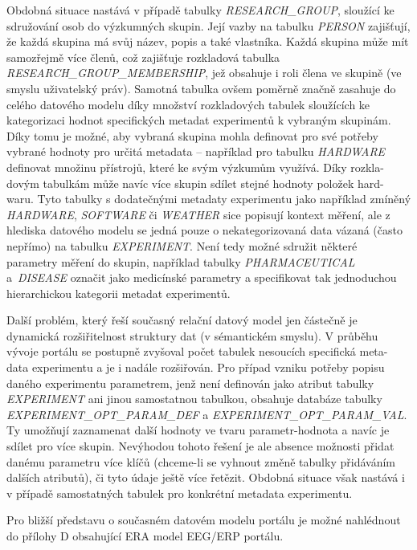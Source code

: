 \documentclass{projekt}
\begin{document}
Obdobná situace nastává v případě tabulky {\it RESEARCH\_GROUP}, sloužící ke sdružování osob do výzkumných skupin. Její vazby na tabulku {\it PERSON} zajišťují, že každá skupina má svůj název, popis a také vlastníka. Každá skupina může mít samozřejmě více členů, což zajišťuje rozkladová tabulka {\it RESEARCH\_GROUP\_MEMBERSHIP}, jež obsahuje i roli člena ve skupině (ve smyslu uživatelský práv). Samotná tabulka ovšem poměrně značně zasahuje do celého datového modelu díky množství rozkladových tabulek sloužících ke kategorizaci hodnot specifických metadat experimentů k vybraným skupinám. Díky tomu je možné, aby vybraná skupina mohla definovat pro své potřeby vybrané hodnoty pro určitá metadata – například pro tabulku {\it HARDWARE} definovat množinu přístrojů, které ke svým výzkumům využívá. Díky rozkla-\\dovým tabulkám může navíc více skupin sdílet stejné hodnoty položek hard-\\waru. Tyto tabulky s dodatečnými metadaty experimentu jako například zmíněný {\it HARDWARE}, {\it SOFTWARE} či {\it WEATHER} sice popisují kontext měření, ale z hlediska datového modelu se jedná pouze o nekategorizovaná data vázaná (často nepřímo) na tabulku {\it EXPERIMENT}. Není tedy možné sdružit některé parametry měření do skupin, například tabulky {\it PHARMACEUTICAL} a~{\it DISEASE} označit jako medicínské parametry a specifikovat tak jednoduchou hierarchickou kategorii metadat experimentů.

Další problém, který řeší současný relační datový model jen částečně je dynamická rozšiřitelnost struktury dat (v sémantickém smyslu). V průběhu vývoje portálu se postupně zvyšoval počet tabulek nesoucích specifická meta-\\data experimentu a je i nadále rozšiřován. Pro případ vzniku potřeby popisu daného experimentu parametrem, jenž není definován jako atribut tabulky {\it EXPERIMENT} ani jinou samostatnou tabulkou, obsahuje databáze tabulky {\it EXPERIMENT\_OPT\_PARAM\_DEF} a {\it EXPERIMENT\_OPT\_PARAM\_VAL}. Ty umožňují zaznamenat další hodnoty ve tvaru parametr-hodnota a navíc je sdílet pro více skupin. Nevýhodou tohoto řešení je ale absence možnosti přidat danému parametru více klíčů (chceme-li se vyhnout změně tabulky přidáváním dalších atributů), či tyto údaje ještě více řetězit. Obdobná situace však nastává i v případě samostatných tabulek pro konkrétní metadata experimentu. 

Pro bližší představu o současném datovém modelu portálu je možné nahlédnout do přílohy D obsahující ERA model EEG/ERP portálu.
\end{document}
